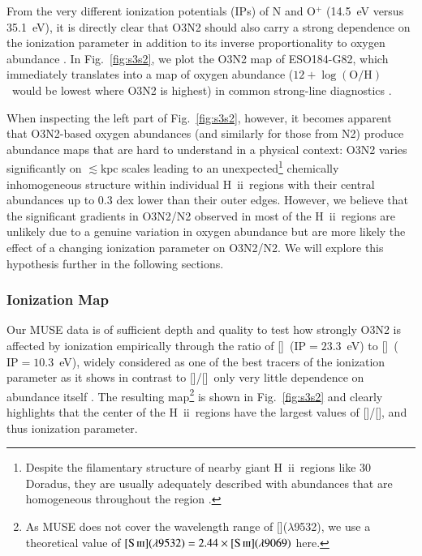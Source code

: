\documentclass[traditabstract, referee]{aa}
\newcommand{\hii}{\mbox{H~{\sc ii}}}
\newcommand{\oh}{12+\log(\mathrm{O/H})}
\newcommand{\sii}{[\ion{S}{ii}]}
\newcommand{\siii}{[\ion{S}{iii}]}
\newcommand{\oii}{[\ion{O}{ii}]}
\newcommand{\oiii}{[\ion{O}{iii}]}
\begin{document}
From the very different ionization potentials (IPs) of N and O$^{+}$ (14.5~eV versus 35.1~eV), it is {directly} clear that O3N2 should also carry a strong dependence on the ionization parameter in addition to its inverse proportionality to oxygen abundance \citep[e.g.][]{1979A&A....78..200A, 2015MNRAS.448.2030H}. In Fig.~\ref{fig:s3s2}, we plot the O3N2 map of ESO184-G82, which immediately translates into a map of oxygen abundance ($\oh$~would be lowest where O3N2 is highest) in common strong-line diagnostics \citep{2004MNRAS.348L..59P}.

When inspecting the left part of Fig.~\ref{fig:s3s2}, however, it becomes apparent that O3N2-based oxygen abundances (and similarly for those from N2) produce abundance maps that are hard to understand in a physical context: O3N2 varies significantly on $\lesssim\mathrm{kpc}$ scales leading to an unexpected\footnote{Despite the filamentary structure of nearby giant \hii~regions like 30 Doradus, they are usually adequately described with abundances that are homogeneous throughout the region \citep[e.g.][and references therein]{2011ApJ...738...34P}.} chemically inhomogeneous structure within individual \hii~regions with their central abundances up to 0.3 dex lower than their outer edges. However, we believe that the significant gradients in O3N2/N2 observed in most of the \hii~regions are unlikely due to a genuine variation in oxygen abundance but are more likely the effect of a changing ionization parameter on O3N2/N2. We will explore this hypothesis further in the following sections.

\subsubsection{Ionization Map}

Our MUSE data is of sufficient depth and quality to test how strongly O3N2 is affected by ionization empirically through the ratio of \siii~($\mathrm{IP}=23.3$~eV) to \sii~($\mathrm{IP}=10.3$~eV), widely considered as one of the best tracers of the ionization parameter \citep{1991MNRAS.253..245D} as it shows in contrast to \oiii/\oii~only very little dependence on abundance itself \citep{2002ApJS..142...35K, 2011MNRAS.415.3616D}. The resulting map\footnote{As MUSE does not cover the wavelength range of \siii($\lambda$9532), we use a theoretical value of $\siii(\lambda9532)=2.44\times\siii(\lambda9069)$ \citep{1982MNRAS.199.1025M} here.} is shown in Fig.~\ref{fig:s3s2} and clearly highlights that the center of the \hii~regions have the largest values of \siii/\sii, and thus ionization parameter.
\end{document}
